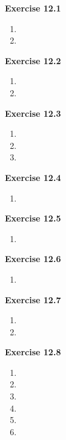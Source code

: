 




\textbf{Exercise 12.1}
\begin{enumerate}
    \item 
    \item 
\end{enumerate}

\textbf{Exercise 12.2}
\begin{enumerate}
    \item 
    \item 
\end{enumerate}

\textbf{Exercise 12.3}
\begin{enumerate}
    \item 
    \item 
    \item 
\end{enumerate}

\textbf{Exercise 12.4}
\begin{enumerate}
    \item 
\end{enumerate}

\textbf{Exercise 12.5}
\begin{enumerate}
    \item 
\end{enumerate}

\textbf{Exercise 12.6}
\begin{enumerate}
    \item 
\end{enumerate}

\textbf{Exercise 12.7}
\begin{enumerate}
    \item 
    \item 
\end{enumerate}

\textbf{Exercise 12.8}
\begin{enumerate}
    \item 
    \item 
    \item 
    \item 
    \item 
    \item 
\end{enumerate}

